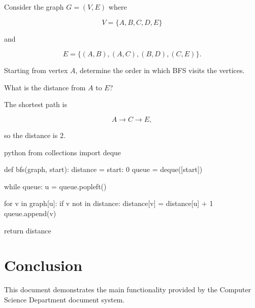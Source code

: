 \documentclass{csdept}
\begin{document}
\begin{exercise}

Consider the graph $G=(V,E)$ where

\[
    V = \{A,B,C,D,E\}
\]

and

\[
    E =
    \{
        (A,B),
        (A,C),
        (B,D),
        (C,E)
    \}.
\]

\begin{task}

Starting from vertex $A$, determine the order in which BFS
visits the vertices.

\end{task}

\begin{question}[2 points]

What is the distance from $A$ to $E$?

\end{question}

\begin{answer}

The shortest path is

\[
    A \rightarrow C \rightarrow E,
\]

so the distance is $2$.

\end{answer}

\begin{code}{python}
from collections import deque

def bfs(graph, start):
    distance = {start: 0}
    queue = deque([start])

    while queue:
        u = queue.popleft()

        for v in graph[u]:
            if v not in distance:
                distance[v] = distance[u] + 1
                queue.append(v)

    return distance
\end{code}

\end{exercise}

\section{Conclusion}

This document demonstrates the main functionality provided by
the Computer Science Department document system.
\end{document}
